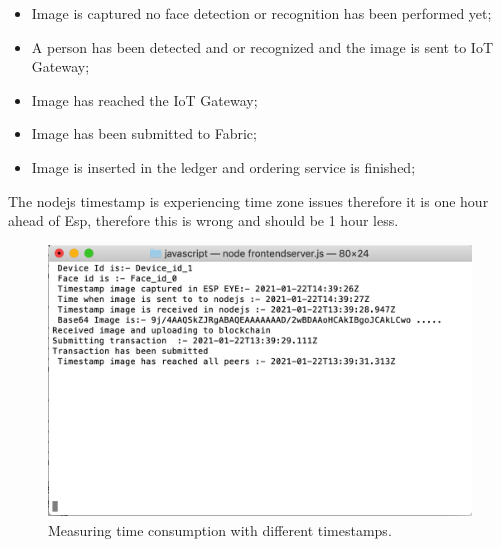 \begin{itemize}
    \item Image is captured no face detection or recognition has been performed yet;
    \item A person has been detected and or recognized and the image is sent to IoT Gateway;
    \item Image has reached the IoT Gateway;
    \item Image has been submitted to Fabric;
    \item Image is inserted in the ledger and ordering service is finished;
\end{itemize}
The nodejs timestamp is experiencing time zone issues therefore it is one hour ahead of Esp, therefore this is wrong and should be 1 hour less. 


\begin{figure}[!htb]
    \centering
    \includegraphics[width=1\textwidth]{figures/nodejs3.png}
    \caption{Measuring time consumption with different timestamps.}
    \label{fig:time_stamp}
\end{figure}


